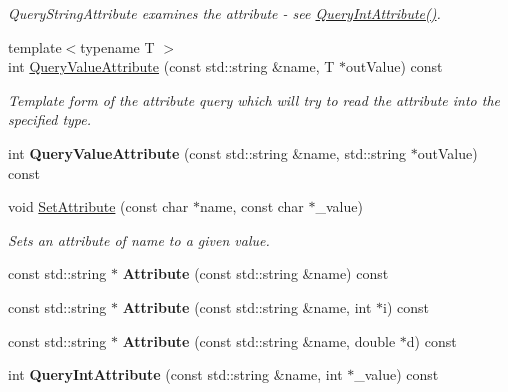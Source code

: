 \begin{DoxyCompactItemize}
\begin{DoxyCompactList}\small\item\em Query\+String\+Attribute examines the attribute -\/ see \hyperlink{class_ti_xml_element_aea0bfe471380f281c5945770ddbf52b9}{Query\+Int\+Attribute()}. \end{DoxyCompactList}\item 
{\footnotesize template$<$typename T $>$ }\\int \hyperlink{class_ti_xml_element_a676f888438f8eb8d69a695ead195edb8}{Query\+Value\+Attribute} (const std\+::string \&name, T $\ast$out\+Value) const 
\begin{DoxyCompactList}\small\item\em Template form of the attribute query which will try to read the attribute into the specified type. \end{DoxyCompactList}\item 
int {\bfseries Query\+Value\+Attribute} (const std\+::string \&name, std\+::string $\ast$out\+Value) const \hypertarget{class_ti_xml_element_a93fb47dab50d5f0d2912b789648c48ca}{}\label{class_ti_xml_element_a93fb47dab50d5f0d2912b789648c48ca}

\item 
void \hyperlink{class_ti_xml_element_abf0b3bd7f0e4c746a89ec6e7f101fc32}{Set\+Attribute} (const char $\ast$name, const char $\ast$\+\_\+value)
\begin{DoxyCompactList}\small\item\em Sets an attribute of name to a given value. \end{DoxyCompactList}\item 
const std\+::string $\ast$ {\bfseries Attribute} (const std\+::string \&name) const \hypertarget{class_ti_xml_element_a83b8b18d6ca253649ce378f8f5a2da49}{}\label{class_ti_xml_element_a83b8b18d6ca253649ce378f8f5a2da49}

\item 
const std\+::string $\ast$ {\bfseries Attribute} (const std\+::string \&name, int $\ast$i) const \hypertarget{class_ti_xml_element_aac36701ac5de73e9ef8c0b1d128e7782}{}\label{class_ti_xml_element_aac36701ac5de73e9ef8c0b1d128e7782}

\item 
const std\+::string $\ast$ {\bfseries Attribute} (const std\+::string \&name, double $\ast$d) const \hypertarget{class_ti_xml_element_a7131fe25a7e512f52ffa27518e108b7e}{}\label{class_ti_xml_element_a7131fe25a7e512f52ffa27518e108b7e}

\item 
int {\bfseries Query\+Int\+Attribute} (const std\+::string \&name, int $\ast$\+\_\+value) const \hypertarget{class_ti_xml_element_ad79cb2416a5b94784f9a517add7e2d6d}{}\label{class_ti_xml_element_ad79cb2416a5b94784f9a517add7e2d6d}


\end{DoxyCompactItemize}
